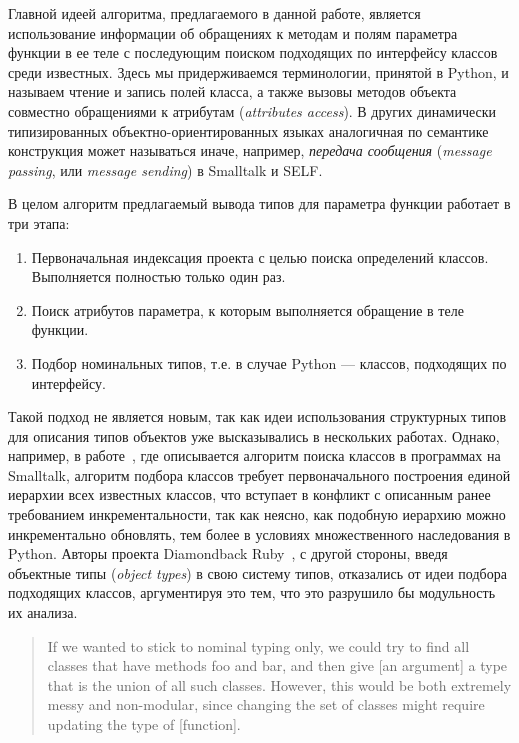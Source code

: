 Главной идеей алгоритма, предлагаемого в данной работе, является использование
информации об обращениях к методам и полям параметра функции в ее теле с
последующим поиском подходящих по интерфейсу классов среди известных. Здесь мы
придерживаемся терминологии, принятой в Python, и называем чтение и запись полей
класса, а также вызовы методов объекта совместно обращениями к атрибутам
(\emph{attributes access}). В других динамически типизированных
объектно-ориентированных языках аналогичная по семантике конструкция может
называться иначе, например, \emph{передача сообщения} (\emph{message passing},
или \emph{message sending}) в Smalltalk и SELF.

В целом алгоритм предлагаемый вывода типов для параметра функции работает в три этапа:

\begin{enumerate}
    \item{Первоначальная индексация проекта с целью поиска определений классов.
      Выполняется полностью только один раз.}
    \item{Поиск атрибутов параметра, к которым выполняется обращение в теле
        функции.}
    \item{Подбор номинальных типов, т.е. в случае Python --- классов, подходящих
      по интерфейсу.}
\end{enumerate}

Такой подход не является новым, так как идеи использования структурных типов для
описания типов объектов уже высказывались в нескольких работах.  Однако,
например, в работе~\cite{Pluquet2009}, где описывается алгоритм поиска классов в
программах на Smalltalk, алгоритм подбора классов требует первоначального
построения единой иерархии всех известных классов, что вступает в конфликт с
описанным ранее требованием инкрементальности, так как неясно, как подобную
иерархию можно инкрементально обновлять, тем более в условиях множественного
наследования в Python.  Авторы проекта Diamondback Ruby~\cite{Furr2009}, с
другой стороны, введя объектные типы (\emph{object types}) в свою систему типов,
отказались от идеи подбора подходящих классов, аргументируя это тем, что это
разрушило бы модульность их анализа.

\begin{quote}
  If we wanted to stick to nominal typing only, we could try to find all classes
  that have methods foo and bar, and then give [an argument] a type that is the
  union of all such classes. However, this would be both extremely messy and
  non-modular, since changing the set of classes might require updating the type
  of [function].
\end{quote}

